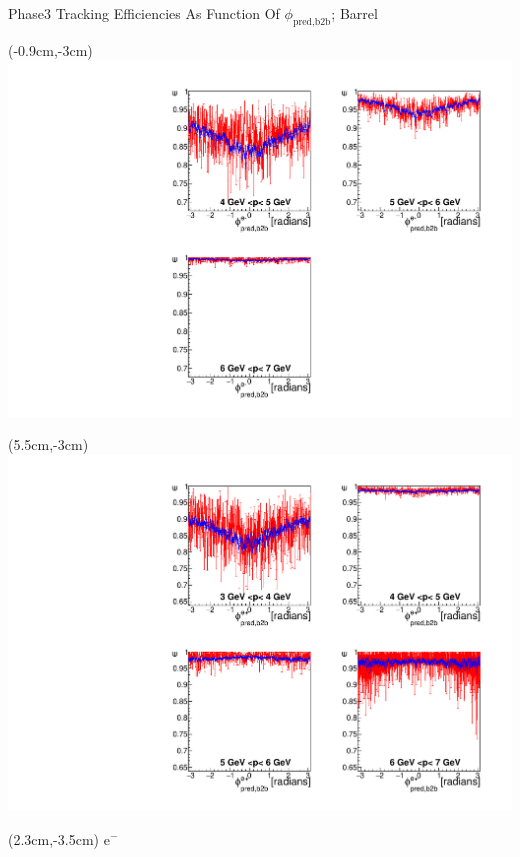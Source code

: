 \documentclass[8pt]{beamer}
\begin{document}
\begin{frame}{Phase3 Tracking Efficiencies As Function Of $\phi_{\textrm{pred,b2b}}$; Barrel}
	
	
	\begin{textblock*}{6.5cm}(-0.9cm,-3cm)
		\includegraphics[width=\textwidth]{VPlots/P3/xPMPhiemBarrelP3}
	\end{textblock*}
	
	\begin{textblock*}{6.5cm}(5.5cm,-3cm)
		\includegraphics[width=\textwidth]{VPlots/P3/xPMPhiepBarrelP3}
	\end{textblock*}
	
	
	\begin{textblock*}{2cm}(2.3cm,-3.5cm)
		$\textrm{e}^-$
	\end{textblock*}
	

\end{frame}
\end{document}
